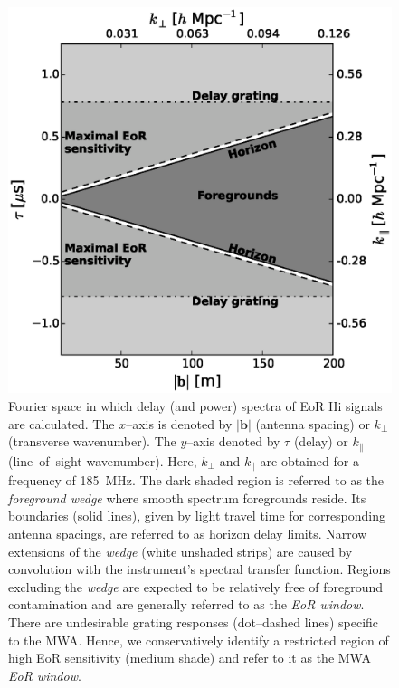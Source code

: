 \documentclass[preprint2,iop,numberedappendix,twocolappendix,appendixfloats]{emulateapj}
\begin{document}
\begin{figure}[htb]
\centering
\includegraphics[width=\linewidth]{figure1.eps}
\caption{Fourier space in which delay (and power) spectra of EoR H{\sc i} signals are calculated. The $x$--axis is denoted by $|\boldsymbol{b}|$ (antenna spacing) or $k_\perp$ (transverse wavenumber). The $y$--axis denoted by $\tau$ (delay) or $k_\parallel$ (line--of--sight wavenumber). Here, $k_\perp$ and $k_\parallel$ are obtained for a frequency of 185~MHz. The dark shaded region is referred to as the {\it foreground wedge} where smooth spectrum foregrounds reside. Its boundaries (solid lines), given by light travel time for corresponding antenna spacings, are referred to as horizon delay limits. Narrow extensions of the {\it wedge} (white unshaded strips) are caused by convolution with the instrument's spectral transfer function. Regions excluding the {\it wedge} are expected to be relatively free of foreground contamination and are generally referred to as the {\it EoR window}. There are undesirable grating responses (dot--dashed lines) specific to the MWA. Hence, we conservatively identify a restricted region of high EoR sensitivity (medium shade) and refer to it as the MWA {\it EoR window}. \label{fig:fourier-space}}
\end{figure}
\end{document}
